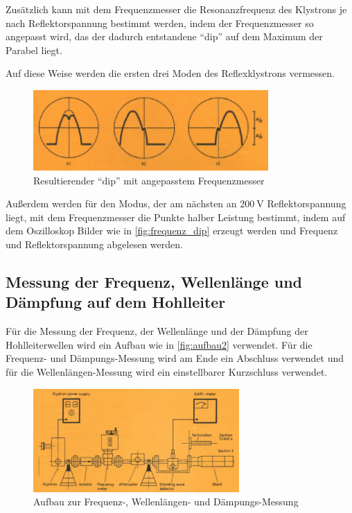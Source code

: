 Zusätzlich kann mit dem Frequenzmesser die Resonanzfrequenz des Klystrons je nach Reflektorspannung bestimmt werden,
indem der Frequenzmesser so angepasst wird, das der dadurch entstandene \enquote{dip} auf dem Maximum der Parabel liegt.

Auf diese Weise werden die ersten drei Moden des Reflexklystrons vermessen.

\begin{figure}
    \centering
    \includegraphics[width=0.8\textwidth]{images/frequenz_dip.png}
    \caption{Resultierender \enquote{dip} mit angepasstem Frequenzmesser \cite{V53_old}}
    \label{fig:frequenz_dip}
\end{figure}

Außerdem werden für den Modus, der am nächsten an $\SI{200}{\volt}$ Reflektorspannung liegt, mit dem Frequenzmesser die Punkte halber Leistung bestimmt,
indem auf dem Oszilloskop Bilder wie in \autoref{fig:frequenz_dip} erzeugt werden und Frequenz und Reflektorspannung abgelesen werden.

\subsection{Messung der Frequenz, Wellenlänge und Dämpfung auf dem Hohlleiter}
\label{ssec:Messung_Hohlleiter}

Für die Messung der Frequenz, der Wellenlänge und der Dämpfung der Hohlleiterwellen wird ein Aufbau wie in \autoref{fig:aufbau2} verwendet.
Für die Frequenz- und Dämpungs-Messung wird am Ende ein Abschluss verwendet und für die Wellenlängen-Messung wird ein einstellbarer Kurzschluss verwendet.

\begin{figure}
    \centering
    \includegraphics[width=0.7\textwidth]{images/aufbau2.png}
    \caption{Aufbau zur Frequenz-, Wellenlängen- und Dämpungs-Messung \cite{V53_old}}
    \label{fig:aufbau2}
\end{figure}

